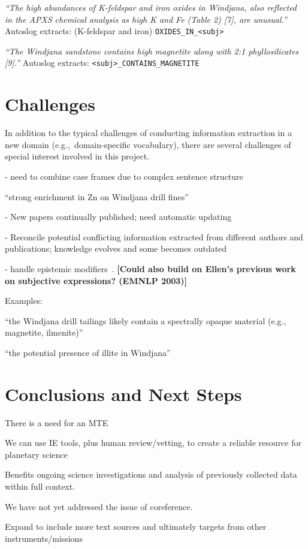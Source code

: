 \documentclass[letterpaper]{article}
\begin{document}
{\em ``The high abundances of K-feldspar and iron oxides in Windjana, also
reflected in the APXS chemical analysis as high K and Fe (Table 2)
[7], are unusual.''}
Autoslog extracts:
(K-feldspar and iron) 
{\tt OXIDES\_IN\_<subj>}

{\em ``The Windjana sandstone contains high magnetite along with 2:1
phyllosilicates [9].''}
Autoslog extracts:
{\tt <subj>\_CONTAINS\_MAGNETITE}

\section{Challenges}

In addition to the typical challenges of conducting information
extraction in a new domain (e.g.,~domain-specific vocabulary), there
are several challenges of special interest involved in this project.

- need to combine case frames due to complex sentence structure

``strong enrichment in Zn on Windjana drill fines''



- New papers continually published; need automatic updating

- Reconcile potential conflicting information extracted from different
  authors and publications; knowledge evolves and some becomes
  outdated

- handle epistemic modifiers~\cite{sokolova:epistemic}. {\bf [Could
  also build on Ellen's previous work on subjective expressions?
  (EMNLP 2003)]} 

Examples:

``the Windjana drill tailings likely contain a spectrally opaque
material (e.g., magnetite, ilmenite)'' 

``the potential presence of illite in Windjana''

\section{Conclusions and Next Steps}

There is a need for an MTE

We can use IE tools, plus human review/vetting, to create a reliable
resource for planetary science 

  Benefits ongoing science
investigations and analysis of previously collected data within full
context.

We have not yet addressed the issue of coreference.

Expand to include more text sources and ultimately targets from other
instruments/missions 



\end{document}
